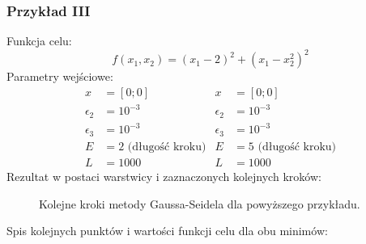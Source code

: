 \documentclass[a4paper,12pt]{article}
\begin{document}
\subsubsection{Przykład III}
Funkcja celu:
\begin{equation}
    f(x_{1}, x_{2}) = (x_{1} - 2)^{2} + (x_{1} - x_{2}^{2})^{2}
\end{equation}
Parametry wejściowe:
\begin{align*}
    x &= [0; 0] & x &= [0; 0]\\
    \epsilon_{2} &= 10^{-3} & \epsilon_{2} &= 10^{-3} \\
    \epsilon_{3} &= 10^{-3} & \epsilon_{3} &= 10^{-3} \\
    E &= 2 \mbox{ (długość kroku)} & E &= 5 \mbox{ (długość kroku)}\\
    L &= 1000 & L &= 1000
\end{align*}
Rezultat w postaci warstwicy i zaznaczonych kolejnych kroków:
\begin{figure}[H]
    \centering
    \quad
    \caption{Kolejne kroki metody Gaussa-Seidela dla powyższego przykładu.}
\end{figure}
Spis kolejnych punktów i wartości funkcji celu dla obu minimów:
\end{document}
